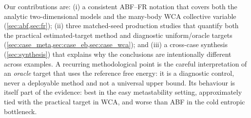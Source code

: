Our contributions are: (i) a consistent ABF--FR notation that covers both the
analytic two-dimensional models and the many-body WCA collective variable
(\cref{sec:abf,sec:fr}); (ii) three matched-seed production studies that quantify
both the practical estimated-target method and diagnostic uniform/oracle targets
(\cref{sec:case_meta,sec:case_eb,sec:case_wca}); and (iii) a cross-case synthesis
(\cref{sec:synthesis}) that explains why the conclusions are intentionally
different across examples. A recurring methodological point is the careful
interpretation of an \emph{oracle} target that uses the reference free energy: it
is a diagnostic control, never a deployable method and not a universal upper
bound. Its behaviour is itself part of the evidence: best in the easy
metastability setting, approximately tied with the practical target in WCA, and
worse than ABF in the cold entropic bottleneck.
